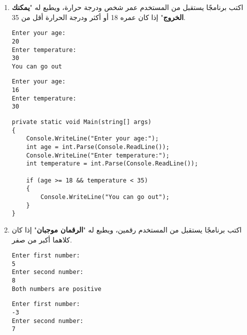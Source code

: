 \documentclass[12pt]{article}
\begin{document}
\begin{enumerate}[itemsep=3em]
\begin{enumerate}[itemsep=3em]
\begin{enumerate}[itemsep=3em]
\begin{enumerate}
\item
اكتب برنامجًا يستقبل من المستخدم عمر شخص ودرجة حرارة، ويطبع له "\textbf{يمكنك الخروج}" إذا كان عمره 18 أو أكثر ودرجة الحرارة أقل من 35.
\ifdetailed
\begin{example}[1]
\begin{english}
\begin{lstlisting}
Enter your age:
20
Enter temperature:
30
You can go out
\end{lstlisting}
\end{english}
\end{example}
\begin{example}[2]
\begin{english}
\begin{lstlisting}
Enter your age:
16
Enter temperature:
30
\end{lstlisting}
\end{english}
\end{example}

\ifwithsols
\begin{solution}
\begin{english}
\begin{lstlisting}
private static void Main(string[] args)
{
    Console.WriteLine("Enter your age:");
    int age = int.Parse(Console.ReadLine());
    Console.WriteLine("Enter temperature:");
    int temperature = int.Parse(Console.ReadLine());

    if (age >= 18 && temperature < 35)
    {
        Console.WriteLine("You can go out");
    }
}
\end{lstlisting}
\end{english}
\end{solution}
\clearpage
\fi
\fi

\item
اكتب برنامجًا يستقبل من المستخدم رقمين، ويطبع له "\textbf{الرقمان موجبان}" إذا كان كلاهما أكبر من صفر.
\ifdetailed
\begin{example}[1]
\begin{english}
\begin{lstlisting}
Enter first number:
5
Enter second number:
8
Both numbers are positive
\end{lstlisting}
\end{english}
\end{example}
\begin{example}[2]
\begin{english}
\begin{lstlisting}
Enter first number:
-3
Enter second number:
7
\end{lstlisting}
\end{english}
\end{example}


\end{enumerate}
\end{enumerate}
\end{enumerate}
\end{enumerate}
\end{document}

